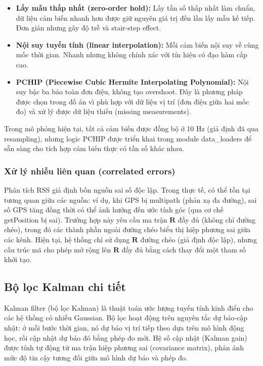 \begin{itemize}
    \item \textbf{Lấy mẫu thấp nhất (zero-order hold):} Lấy tần số thấp nhất làm chuẩn, dữ liệu cảm biến nhanh hơn được giữ nguyên giá trị đến lần lấy mẫu kế tiếp. Đơn giản nhưng gây độ trễ và stair-step effect.
    \item \textbf{Nội suy tuyến tính (linear interpolation):} Mỗi cảm biến nội suy về cùng mốc thời gian. Nhanh nhưng không chính xác với tín hiệu có đạo hàm cấp cao.
    \item \textbf{PCHIP (Piecewise Cubic Hermite Interpolating Polynomial):} Nội suy bậc ba bảo toàn đơn điệu, không tạo overshoot. Đây là phương pháp được chọn trong đồ án vì phù hợp với dữ liệu vị trí (đơn điệu giữa hai mốc đo) và xử lý được dữ liệu thiếu (missing measurements).
\end{itemize}

Trong mô phỏng hiện tại, tất cả cảm biến được đồng bộ ở 10 Hz (giả định đã qua resampling), nhưng logic PCHIP được triển khai trong module data\_loaders để sẵn sàng cho tích hợp cảm biến thực có tần số khác nhau.

\subsubsection{Xử lý nhiễu liên quan (correlated errors)}
\hspace{0.5cm} Phân tích RSS giả định bốn nguồn sai số độc lập. Trong thực tế, có thể tồn tại tương quan giữa các nguồn: ví dụ, khi GPS bị multipath (phản xạ đa đường), sai số GPS tăng đồng thời có thể ảnh hưởng đến ước tính góc (qua cơ chế getPosition bị sai). Trường hợp này yêu cầu ma trận $\mathbf{R}$ đầy đủ (không chỉ đường chéo), trong đó các thành phần ngoài đường chéo biểu thị hiệp phương sai giữa các kênh. Hiện tại, hệ thống chỉ sử dụng $\mathbf{R}$ đường chéo (giả định độc lập), nhưng cấu trúc mã cho phép mở rộng lên $\mathbf{R}$ đầy đủ bằng cách thay đổi một tham số khởi tạo.

\subsection{Bộ lọc Kalman chi tiết}

\hspace{0.5cm} Kalman filter (bộ lọc Kalman) là thuật toán ước lượng tuyến tính kinh điển cho các hệ thống có nhiễu Gaussian. Bộ lọc hoạt động trên nguyên tắc dự báo-cập nhật: ở mỗi bước thời gian, nó dự báo vị trí tiếp theo dựa trên mô hình động học, rồi cập nhật dự báo đó bằng phép đo mới. Hệ số cập nhật (Kalman gain) được tính tự động từ ma trận hiệp phương sai (covariance matrix), phản ánh mức độ tin cậy tương đối giữa mô hình dự báo và phép đo.

